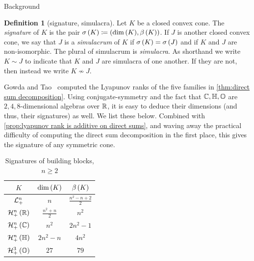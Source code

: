 \documentclass{interact}
\theoremstyle{plain}
\theoremstyle{definition}
\newtheorem{definition}[theorem]{Definition}
\theoremstyle{remark}
\newcommand*{\signature}[1]{ \sigma\of{#1} }
\begin{document}
\begin{section}{Background}
    \begin{definition}[signature, simulacra]
      Let $K$ be a closed convex cone. The \emph{signature} of $K$ is
      the pair $\signature{K} \coloneqq
      \pair{\dim\of{K}}{\lyapunovrank{K}}$. If $J$ is another closed
      convex cone, we say that $J$ is a \emph{simulacrum} of $K$ if
      $\signature{K} = \signature{J}$ and if $K$ and $J$ are
      non-isomorphic. The plural of simulacrum is \emph{simulacra}. As
      shorthand we write $K \sim J$ to indicate that $K$ and $J$ are
      simulacra of one another. If they are not, then instead we write
      $K \nsim J$.
    \end{definition}

    Gowda and Tao~\cite{gowda-tao_-_rank} computed the Lyapunov ranks
    of the five families in \cref{thm:direct sum decomposition}. Using
    conjugate-symmetry and the fact that
    $\Cn[1],\quaternions,\octonions$ are $2,4,8$-dimensional algebras
    over $\Rn[1]$, it is easy to deduce their dimensions (and thus,
    their signatures) as well. We list these below. Combined with
    \cref{prop:lyapunov rank is additive on direct sums}, and waving
    away the practical difficulty of computing the direct sum
    decomposition in the first place, this gives the signature of any
    symmetric cone.

    \begin{table}[H]
      \begin{center}
        \begin{tabular}{c cc}
          $K$ & $\dim\of{K}$ & $\lyapunovrank{K}$\\
          \midrule
          $\Lnplus$                   & $n$
                                      & $\frac{n^{2} - n + 2}{2}$
          \\
          $\Hnplus\of{\Rn[1]}$        & $\frac{n^{2}+n}2$
                                      & $n^{2}$
          \\
          $\Hnplus\of{\Cn[1]}$        & $n^{2}$
                                      & $2n^{2} - 1$
          \\
          $\Hnplus\of{\quaternions}$  & $2n^{2} - n$
                                      & $4n^{2}$
          \\
          $\Hnplus[3]\of{\octonions}$ & $27$
                                      & $79$
        \end{tabular}
        \caption{Signatures of building blocks, $n \ge 2$}\label{tab:signatures of building blocks}
      \end{center}
    \end{table}


\end{section}
\end{document}

